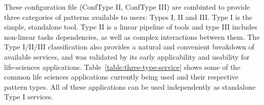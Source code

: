 \documentclass[]{svjour3}
\begin{document}








These configuration file (ConfType II, ConfType III) are combinted to
provide three categories of patterns available to users: Types I, II
and III.  Type I is the simple, standalone tool.  Type II is a linear
pipeline of tools and type III includes non-linear tasks dependencies,
as well as complex interactions between them.  The Type I/II/III
classification also provides a natural and convenient breakdown of
available services, and was validated by its early applicability and
usability for life-sciences applications.
Table~\ref{table:three-type-service} shows some of the common life
sciences applications currently being used and their respective
pattern types. All of these applications can be used independently as
standalone Type I services.


\end{document}
